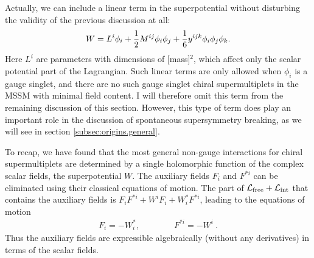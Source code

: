 \documentclass[11pt]{article}
\def\beq{\begin{eqnarray}}
\def\eeq{\end{eqnarray}}
\def\lagr{{\cal L}}
\begin{document}
Actually, we can include a linear term in the superpotential without
disturbing the validity of the previous discussion at all: 
\beq
W = L^i \phi_i +
{1\over 2} M^{ij} \phi_i \phi_j + {1\over 6} y^{ijk} \phi_i \phi_j \phi_k
.
\label{superpotentialwithlinear}
\eeq
Here $L^i$ are parameters with dimensions of [mass]$^2$, which affect only
the scalar potential part of the Lagrangian. Such
linear terms are only allowed when $\phi_i$ is a gauge singlet, and there are
no such gauge singlet chiral supermultiplets in the MSSM with minimal
field content.  I will therefore omit this term from the remaining
discussion of this section.  However, this type of term does play an
important role in the discussion of spontaneous supersymmetry breaking, as
we will see in section \ref{subsec:origins.general}. 

To recap, we have found that the most general non-gauge interactions for
chiral supermultiplets are determined by a single holomorphic function of the
complex scalar fields, the superpotential $W$. The auxiliary fields $F_i$
and $F^{*i}$ can be eliminated using their classical equations of motion.
The part of $\lagr_{\rm free} + \lagr_{\rm int}$ that contains the
auxiliary fields is $ F_i F^{*i} + W^i F_{i} + W^{*}_i F^{*i}$, leading to
the equations of motion
\beq
F_i = -W_i^*,\qquad\qquad F^{*i} = -W^i \> .
\label{replaceF}
\eeq
Thus the auxiliary fields are expressible algebraically (without any
derivatives) in terms of the scalar fields. 
\end{document}
